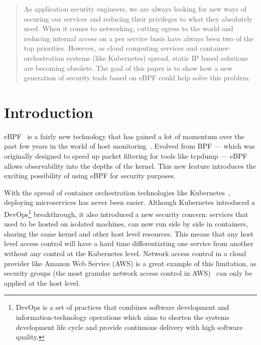 


\maketitle
{}

\begin{abstract}
  As application security engineers, we are always looking for new ways of securing our services and reducing their privileges to what they absolutely need. When it comes to networking, cutting egress to the world and reducing internal access on a per service basis have always been two of the top priorities. However, as cloud computing services and container-orchestration systems (like Kubernetes) spread, static IP based solutions are becoming obsolete. The goal of this paper is to show how a new generation of security tools based on eBPF could help solve this problem.
\end{abstract}

\section{Introduction}

eBPF~\cite{ProcessLevelNetworkSecurityMonitoring:LorenzoFontanaDavidCalavera,ProcessLevelNetworkSecurityMonitoring:GregMarsden} is a fairly new technology that has gained a lot of momentum over the past few years in the world of host monitoring~\cite{ProcessLevelNetworkSecurityMonitoring:BrendanGregg}. Evolved from BPF — which was originally designed to speed up packet filtering for tools like tcpdump — eBPF allows observability into the depths of the kernel. This new feature introduces the exciting possibility of using eBPF for security purposes.

With the spread of container orchestration technologies like Kubernetes~\cite{ProcessLevelNetworkSecurityMonitoring:JohnArundelJustinDomingus}, deploying microservices has never been easier. Although Kubernetes introduced a DevOps\footnote{DevOps is a set of practices that combines software development and information-technology operations which aims to shorten the systems development life cycle and provide continuous delivery with high software quality.} breakthrough, it also introduced a new security concern: services that used to be hosted on isolated machines, can now run side by side in containers, sharing the same kernel and other host level resources. This means that any host level access control will have a hard time differentiating one service from another without any control at the Kubernetes level. Network access control in a cloud provider like Amazon Web Service (AWS) is a great example of this limitation, as security groups (the most granular network access control in AWS)~\cite{ProcessLevelNetworkSecurityMonitoring:HeartinKanikathottu} can only be applied at the host level.

